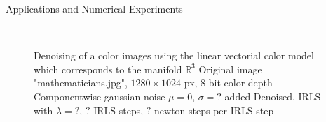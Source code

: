 \begin{chapter}{Applications and Numerical Experiments}
\begin{figure}[h!]
    \centering
    \\
    \caption[Denoising linear vectorial]{Denoising of a color images using the linear vectorial color model which corresponds to the manifold $\mathbb{R}^3$
	 Original image "mathematicians.jpg", $1280\times 1024$ px, 8 bit color depth
	 Componentwise gaussian noise $\mu=0$, $\sigma=?$ added
	 Denoised, IRLS with $\lambda=?$, $?$ IRLS steps, $?$ newton steps per IRLS step
	\label{fig:application_color2}
    }
\end{figure}


\FloatBarrier

\end{chapter}
